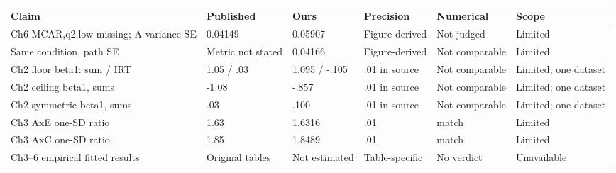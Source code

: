 \begin{longtable}{p{1.7in}p{.8in}p{.8in}p{.75in}p{.8in}p{1in}}
\toprule
Claim & Published & Ours & Precision & Numerical & Scope\\\midrule\endhead
Ch6 MCAR,q2,low missing; A variance SE & 0.04149 & 0.05907 & Figure-derived & Not judged & Limited\\
Same condition, path SE & Metric not stated & 0.04166 & Figure-derived & Not comparable & Limited\\
Ch2 floor beta1: sum / IRT & 1.05 / .03 & 1.095 / -.105 & .01 in source & Not comparable & Limited; one dataset\\
Ch2 ceiling beta1, sums & -1.08 & -.857 & .01 in source & Not comparable & Limited; one dataset\\
Ch2 symmetric beta1, sums & .03 & .100 & .01 in source & Not comparable & Limited; one dataset\\
Ch3 AxE one-SD ratio & 1.63 & 1.6316 & .01 & match & Limited\\
Ch3 AxC one-SD ratio & 1.85 & 1.8489 & .01 & match & Limited\\
Ch3--6 empirical fitted results & Original tables & Not estimated & Table-specific & No verdict & Unavailable\\
\bottomrule\end{longtable}